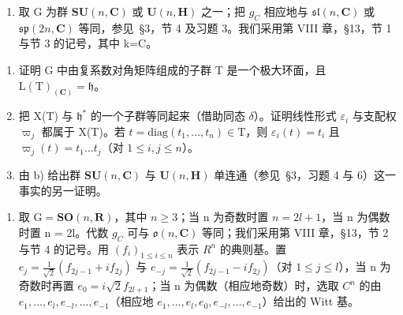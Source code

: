 
\begin{enumerate}
\def\labelenumi{\arabic{enumi})}
\tightlist
\item
  取 G 为群 \(\mathbf{SU}(n,\mathbf{C})\) 或 \(\mathbf{U}(n,\mathbf{H})\) 之一；把 \(g_{C}\) 相应地与 \(\mathfrak{sl}(n,\mathbf{C})\) 或 \(\mathfrak{sp}(2n,\mathbf{C})\) 等同，参见~§3，节 4 及习题 3。我们采用第 VIII 章，§13，节 1 与节 3 的记号，其中 k=C。
\end{enumerate}

\begin{enumerate}
\def\labelenumi{\alph{enumi})}
\item
  证明 G 中由复系数对角矩阵组成的子群 T 是一个极大环面，且 \(\mathrm{L}(\mathrm{T})_{(\mathbf{C})} = \mathfrak{h}\)。
\item
  把 X(T) 与 \(\mathfrak{h}^*\) 的一个子群等同起来（借助同态 \(\delta\)）。证明线性形式 \(\varepsilon_i\) 与支配权 \(\varpi_j\) 都属于 X(T)。若 \(t = \mathrm{diag}(t_1, \ldots, t_n) \in \mathrm{T}\)，则 \(\varepsilon_i(t) = t_i\) 且 \(\varpi_j(t) = t_1 \ldots t_j\)（对 \(1 \leq i, j \leq n\)）。
\item
  由 b) 给出群 \(\mathbf{SU}(n,\mathbf{C})\) 与 \(\mathbf{U}(n,\mathbf{H})\) 单连通（参见~§3，习题 4 与 6）这一事实的另一证明。
\end{enumerate}

\begin{enumerate}
\def\labelenumi{\arabic{enumi})}
\setcounter{enumi}{1}
\tightlist
\item
  取 \(\mathrm{G} = \mathbf{SO}(n, \mathbf{R})\)，其中 \(n \geq 3\)；当 n 为奇数时置 \(n = 2l + 1\)，当 n 为偶数时置 n = 2l。代数 \(g_{C}\) 可与 \(\mathfrak{o}(n, \mathbf{C})\) 等同；我们采用第 VIII 章，§13，节 2 与节 4 的记号。用 \((f_i)_{1 \leq i \leq n}\) 表示 \(R^n\) 的典则基。置 \(e_j = \frac{1}{\sqrt{2}}(f_{2j-1} + if_{2j})\) 与 \(e_{-j} = \frac{1}{\sqrt{2}}(f_{2j-1} - if_{2j})\)（对 \(1 \leq j \leq l\)），当 n 为奇数时再置 \(e_0 = i\sqrt{2}f_{2l+1}\)；当 n 为偶数（相应地奇数）时，选取 \(C^n\) 的由 \(e_1, \ldots, e_l, e_{-l}, \ldots, e_{-1}\)（相应地 \(e_1, \ldots, e_l, e_0, e_{-l}, \ldots, e_{-1}\)）给出的 Witt 基。
\end{enumerate}

